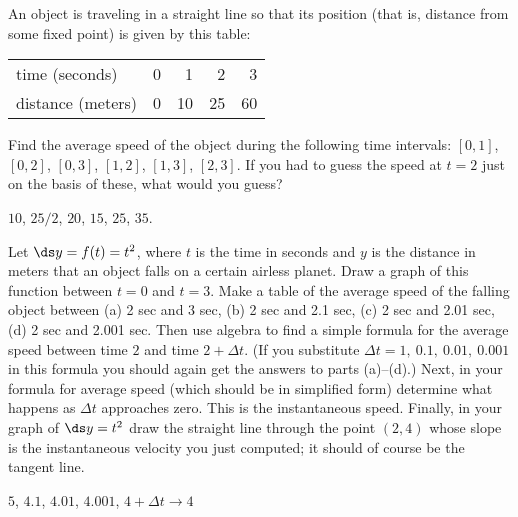 \begin{exercises}

\begin{exercise}
An object is traveling in a straight line so that its position (that
is, distance from some fixed point) is
given by this table:

\begin{table}[h]
  \begin{center}
    \begin{tabular}{lrrrr}
      \toprule
      time (seconds) & 0 & 1 & 2 & 3 \\
      distance (meters) & 0 & 10 & 25 & 60 \\
      \bottomrule
    \end{tabular}
  \end{center}
\end{table}

{}Find the average speed of the object during the following time
intervals: $[0,1]$, $[0,2]$, $[0,3]$,
$[1,2]$, $[1,3]$, $[2,3]$. If you had to guess the speed at
$t=2$ just on the basis of these, what would you guess?
\begin{answer} $10$, $25/2$, $20$, $15$, $25$, $35$.
\end{answer}\end{exercise}

\begin{exercise}
Let $\ds y=f(t)=t^2$, where $t$ is the time in seconds and $y$ is the distance
in meters that an object falls on a certain airless planet.  Draw a graph
of this function between $t=0$ and $t=3$.  Make a table of the average
speed of the falling object between (a) 2 sec and 3 sec, (b) 2 sec and
2.1 sec, (c) 2 sec and 2.01 sec, (d) 2 sec and 2.001 sec.  Then use algebra
to find a simple formula for the average speed between time $2$ and time
$2+
\Delta t$.  (If you substitute $\Delta t=1,\>0.1,\>0.01,\>0.001$ in this
formula you should again get the answers to parts (a)--(d).)  Next, in your
formula for average speed (which should be in simplified form) determine
what happens as $\Delta t$ approaches zero.  This is the instantaneous
speed.  Finally, in your graph of $\ds y=t^2$ draw the straight line
through the point $(2,4)$ whose slope is the instantaneous velocity you
just computed; it should of course be the tangent line.
\begin{answer} $5$, $4.1$, $4.01$, $4.001$, $4+\Delta t\rightarrow 4$
\end{answer}\end{exercise}


\end{exercises}
